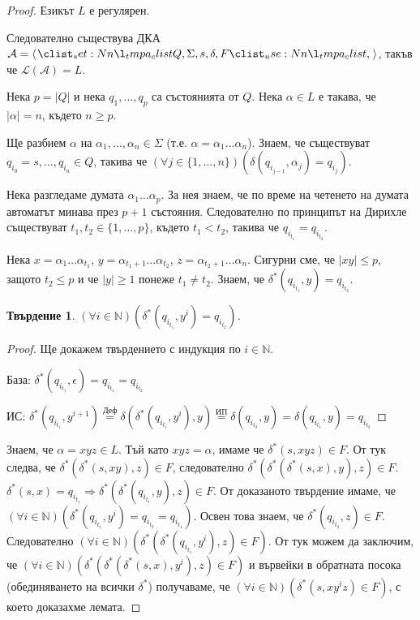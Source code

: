 \documentclass[11pt, a5paper]{report}
\theoremstyle{definition}
\theoremstyle{plain}
\newtheorem{claim}[definition]{Твърдение}
\theoremstyle{remark}
\theoremstyle{definition}
\begin{document}
\begin{proof}
    Езикът $L$ е регулярен.

    Следователно съществува ДКА
    $\mathcal{A} = \opair{Q, \Sigma, s, \delta, F}$,
    такъв че $\mathcal{L}(\mathcal{A}) = L$.

    Нека $p = |Q|$ и нека $q_1, \dots, q_p$ са състоянията от $Q$.
    Нека $\alpha \in L$ е такава, че $|\alpha| = n$, където $n \geq p$.

    Ще разбием $\alpha$ на $\alpha_1, \dots, \alpha_n \in \Sigma$ (т.е. $\alpha = \alpha_1\dots\alpha_n$).
    Знаем, че съществуват $q_{i_0} = s, \dots, q_{i_n} \in Q$, такива че
    $(\forall j \in \{1, \dots, n\}) (\delta(q_{i_{j-1}}, \alpha_j) = q_{i_j})$.

    Нека разгледаме думата $\alpha_1 \dots \alpha_p$.
    За нея знаем, че по време на четенето на думата
    автоматът минава през $p + 1$ състояния.
    Следователно по принципът на Дирихле съществуват
    $t_1, t_2 \in \{1, \dots, p\}$, където $t_1 < t_2$,
    такива че $q_{i_{t_1}} = q_{i_{t_2}}$.

    Нека
    $x = \alpha_1 \dots \alpha_{t_1}$,
    $y = \alpha_{t_1 + 1} \dots \alpha_{t_2}$,
    $z = \alpha_{t_2 + 1} \dots \alpha_n$.
    Сигурни сме, че $|xy| \leq p$, защото $t_2 \leq p$ и че $|y| \geq 1$ понеже $t_1 \neq t_2$.
    Знаем, че $\delta^*(q_{i_{t_1}}, y) = q_{i_{t_2}}$.

    \begin{claim}
        $(\forall i \in \mathbb{N}) (\delta^*(q_{i_{t_1}}, y^i) = q_{i_{t_2}})$.
    \end{claim}

    \begin{proof}
        Ще докажем твърдението с индукция по $i \in \mathbb{N}$.

        База: $\delta^*(q_{i_{t_1}}, \epsilon) = q_{i_{t_1}} = q_{i_{t_2}}$ \checkmark

        ИС: $\delta^*(q_{i_{t_1}}, y^{i+1}) \overset{\text{Деф}}{=} \delta(\delta^*(q_{i_{t_1}}, y^i), y) \overset{\text{ИП}}{=} \delta(q_{i_{t_2}}, y) = \delta(q_{i_{t_1}}, y) = q_{i_{t_2}}$
    \end{proof}

    Знаем, че $\alpha = xyz \in L$.
    Тъй като $xyz = \alpha$, имаме че $\delta^*(s, xyz) \in F$.
    От тук следва, че $\delta^*(\delta^*(s, xy), z) \in F$,
    следователно $\delta^*(\delta^*(\delta^*(s, x), y), z) \in F$.
    $\delta^*(s, x) = q_{i_{t_1}} \Rightarrow \delta^*(\delta^*(q_{i_{t_1}}, y), z) \in F$.
    От доказаното твърдение имаме, че $(\forall i \in \mathbb{N}) (\delta^*(q_{i_{t_1}}, y^i) = q_{i_{t_2}} = q_{i_{t_1}})$.
    Освен това знаем, че $\delta^*(q_{i_{t_2}}, z) \in F$.
    Следователно
    $(\forall i \in \mathbb{N}) (\delta^*(\delta^*(q_{i_{t_1}}, y^i), z) \in F)$.
    От тук можем да заключим, че
    $(\forall i \in \mathbb{N}) (\delta^*(\delta^*(\delta^*(s, x), y^i), z) \in F)$
    и вървейки в обратната посока (обединяването на всички $\delta^*$) получаваме, че
    $(\forall i \in \mathbb{N}) (\delta^*(s, xy^iz) \in F)$,
    с което доказахме лемата.

\end{proof}
\end{document}
